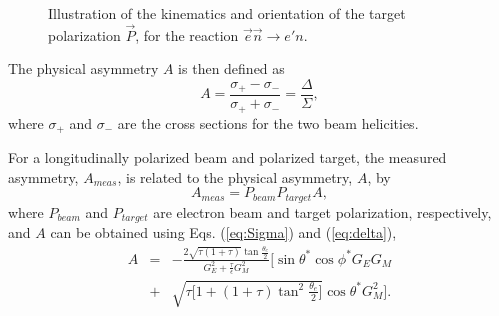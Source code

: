 \begin{figure}
\begin{center}
\caption{Illustration of the kinematics and orientation of the target polarization $\vec P$, for the reaction $\vec e \vec n \rightarrow e' n$. }
\label{fig:epkin_asym}
\end{center}
\end{figure}

The physical asymmetry $A$ is then defined as 
\begin{equation}
A=\frac{\sigma_{+} -\sigma_{-}}{\sigma_{+} + \sigma_{-}}=\frac{\Delta}{\Sigma},
\label{eq:asy}
\end{equation}
\noindent
where $\sigma_+$ and $\sigma_-$ are the cross sections for the two beam helicities. 

For a longitudinally polarized beam and polarized target, the measured asymmetry, $A_{meas}$, is 
related to the physical asymmetry, $A$, by 
\begin{equation}
A_{meas}=P_{beam}P_{target}A,
\label{eq:asy1}
\end{equation}
\noindent
where $P_{beam}$ and $P_{target}$ are electron beam and target polarization, respectively, and 
 $A$ can be obtained using Eqs. (\ref{eq:Sigma}) and (\ref{eq:delta}),  
\begin{eqnarray}
A &=&-\frac{2\sqrt{\tau(1+\tau)}\tan\frac{\theta_e}{2}}{G_E^2+\frac{\tau}{\epsilon}G_M^2}
\Big[ \sin\theta^{\ast}\cos\phi^{\ast}G_E G_M \nonumber \\
&+& \sqrt{\tau\big[1+(1+\tau)\tan^2\frac{\theta_e}{2}\big]} \cos\theta^{\ast}G_M^2 \Big].
\label{eq:asy2}
\end{eqnarray}


